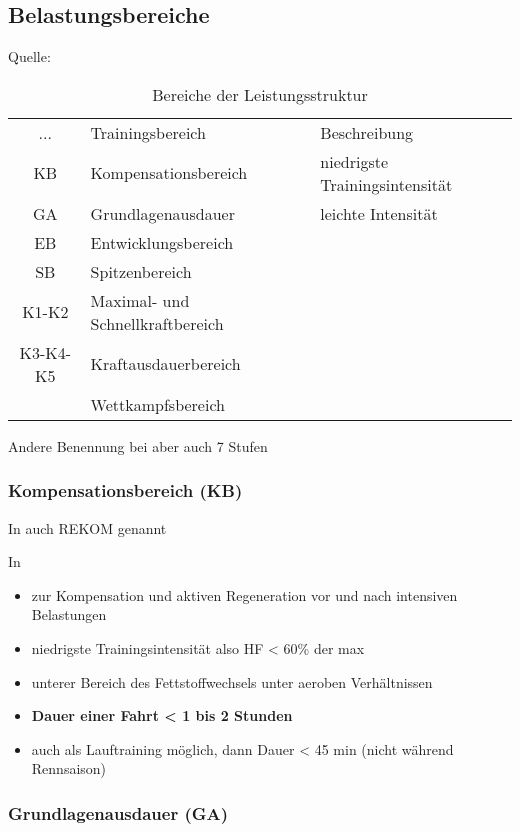     \subsection{Belastungsbereiche}
    Quelle: \cite[31-39]{Radsporttraining}
    \begin{table}[h]
        \centering
        \begin{tabular}[h]{c|l|l}
            ... & Trainingsbereich & Beschreibung \\
            KB & Kompensationsbereich & niedrigste Trainingsintensität \\
            GA & Grundlagenausdauer & leichte Intensität \\
            EB & Entwicklungsbereich & \\
            SB & Spitzenbereich & \\
            K1-K2 & Maximal- und Schnellkraftbereich & \\
            K3-K4-K5 & Kraftausdauerbereich & \\
            & Wettkampfsbereich & \\
        \end{tabular}
        \caption{Bereiche der Leistungsstruktur}
        \label{tab:trainingsbereiche}
    \end{table}
    
    Andere Benennung bei \cite[27]{Ausdauertrainer} aber auch 7 Stufen
    
    \subsubsection{Kompensationsbereich (KB)}
    In \cite[46]{Ausdauertrainer} auch REKOM genannt
    
    In \cite[]{Radsporttraining}
    \begin{itemize}
        \item zur Kompensation und aktiven Regeneration vor und nach intensiven Belastungen
        \item niedrigste Trainingsintensität also HF < 60\% der max
        \item unterer Bereich des Fettstoffwechsels unter aeroben Verhältnissen
        \item \textbf{Dauer einer Fahrt < 1 bis 2 Stunden}
        \item auch als Lauftraining möglich, dann Dauer < 45 min (nicht während Rennsaison)
    \end{itemize}
    \subsubsection{Grundlagenausdauer (GA)}
